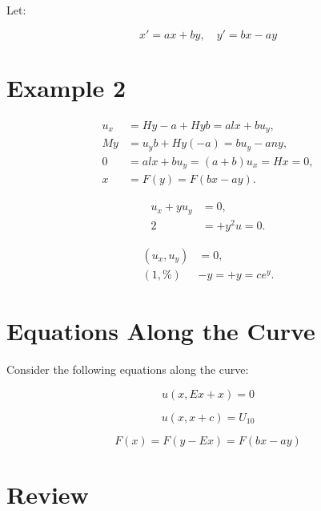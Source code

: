 \documentclass[11pt]{article}
\begin{document}
Let:

\[
x' = ax + by, \quad y' = bx - ay
\]






\section*{Example 2}

\begin{align}
    u_x &= Hy - a + Hyb = a l x + b u_y, \\
    My &= u_y b + Hy(-a) = b u_y - a n y, \\
    0 &= a l x + b u_y = (a + b) u_x = Hx = 0, \\
    x &= F(y) = F(bx - ay).
\end{align}

\begin{align}
    u_x + y u_y &= 0, \\
    2 &= + y^2 u = 0.
\end{align}

\begin{align}
    (u_x, u_y) &= 0, \\
    (1, \%) &- y = + y = c e^y.
\end{align}





\section*{Equations Along the Curve}

Consider the following equations along the curve:

\begin{equation}
u(x, Ex + x) = 0
\end{equation}

\begin{equation}
u(x, x + c) = U_{10}
\end{equation}

\begin{equation}
F(x) = F(y - Ex) = F(bx - ay)
\end{equation}




\clearpage
\section*{Review}
\end{document}
